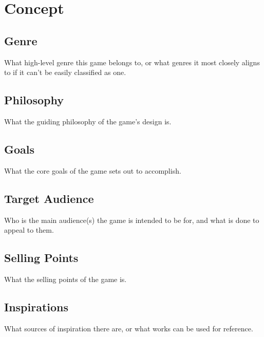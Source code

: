 

\newcommand{\gddTitle}{Game Name}
\newcommand{\gddSubtitle}{Game Subtitle}
\newcommand{\gddCompany}{Company Name}
\newcommand{\gddAuthors}{Firstname Lastname, Firstname Lastname, Firstname Lastname}
\newcommand{\gddDate}{January 1st, 1960}
\newcommand{\gddVersion}{1.0.0}

\newcommand{\gddChangelogEntries}{
\gddChangelogEntry{0.1.0}{January 1st, 1960}{
Changelog List\begin{itemize}
\item Point A
\item Point B
\item Point C
\end{itemize}}
\gddChangelogEntry{0.0.1}{January 1st, 1960}{Changelog Modified}
\gddChangelogEntry{0.0.0}{January 1st, 1960}{Changelog Created}
}



\gddTitlepage
\gddChangelog

\section{Concept}
\subsection{Genre}
What high-level genre this game belongs to, or what genres it most closely aligns to if it can't be easily classified as one.
\subsection{Philosophy}
What the guiding philosophy of the game's design is.
\subsection{Goals}
What the core goals of the game sets out to accomplish.
\subsection{Target Audience}
Who is the main audience(s) the game is intended to be for, and what is done to appeal to them.
\subsection{Selling Points}
What the selling points of the game is.
\subsection{Inspirations}
What sources of inspiration there are, or what works can be used for reference.
